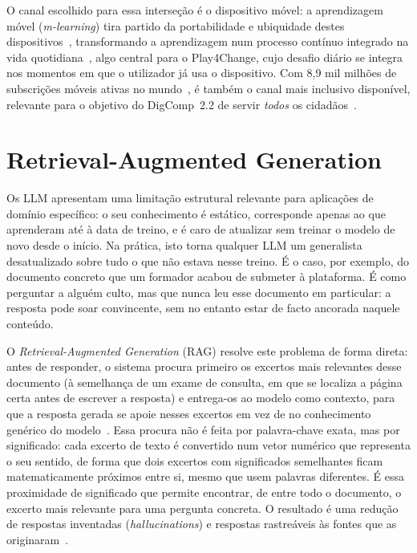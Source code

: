 O canal escolhido para essa interseção é o dispositivo móvel: a aprendizagem móvel (\textit{m-learning}) tira partido da portabilidade e ubiquidade destes dispositivos~\cite{traxler2007}, transformando a aprendizagem num processo contínuo integrado na vida quotidiana~\cite{laurillard2007}, algo central para o Play4Change, cujo desafio diário se integra nos momentos em que o utilizador já usa o dispositivo. Com 8,9 mil milhões de subscrições móveis ativas no mundo~\cite{itu2023}, é também o canal mais inclusivo disponível, relevante para o objetivo do DigComp~2.2 de servir \textit{todos} os cidadãos~\cite{digcomp22}.

\section{Retrieval-Augmented Generation} \label{sec:rag-arte}

Os LLM apresentam uma limitação estrutural relevante para aplicações de domínio específico: o seu conhecimento é estático, corresponde apenas ao que aprenderam até à data de treino, e é caro de atualizar sem treinar o modelo de novo desde o início. Na prática, isto torna qualquer LLM um generalista desatualizado sobre tudo o que não estava nesse treino. É o caso, por exemplo, do documento concreto que um formador acabou de submeter à plataforma. É como perguntar a alguém culto, mas que nunca leu esse documento em particular: a resposta pode soar convincente, sem no entanto estar de facto ancorada naquele conteúdo.

O \textit{Retrieval-Augmented Generation} (RAG) resolve este problema de forma direta: antes de responder, o sistema procura primeiro os excertos mais relevantes desse documento (à semelhança de um exame de consulta, em que se localiza a página certa antes de escrever a resposta) e entrega-os ao modelo como contexto, para que a resposta gerada se apoie nesses excertos em vez de no conhecimento genérico do modelo~\cite{lewis2020}. Essa procura não é feita por palavra-chave exata, mas por significado: cada excerto de texto é convertido num vetor numérico que representa o seu sentido, de forma que dois excertos com significados semelhantes ficam matematicamente próximos entre si, mesmo que usem palavras diferentes. É essa proximidade de significado que permite encontrar, de entre todo o documento, o excerto mais relevante para uma pergunta concreta. O resultado é uma redução de respostas inventadas (\textit{hallucinations}) e respostas rastreáveis às fontes que as originaram~\cite{gao2024}.

